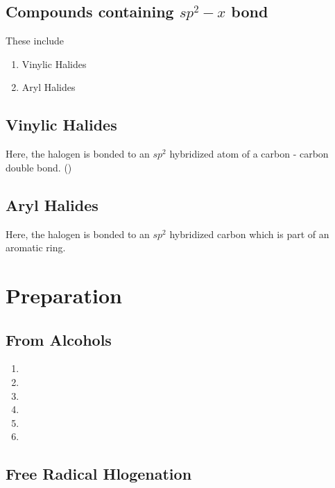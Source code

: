 \documentclass{article}
\begin{document}
\subsection{Compounds containing $sp^2-x$ bond}
These include
\begin{enumerate}
  \item Vinylic Halides
    \item{Aryl Halides}

\end{enumerate}
\subsection*{Vinylic Halides}
Here, the halogen is bonded to an $sp^2$ hybridized atom of a carbon - carbon
double bond. ()
\vspace{5mm}

 \qquad{} 
\subsection*{Aryl Halides}
Here, the halogen is bonded to an $sp^2$ hybridized carbon which
is part of an aromatic ring.
\vspace{5mm}



\section{Preparation}
\subsection{From Alcohols}
\begin{enumerate}
 \item {}
 \item {}
 \item {}
 \item {}
 \item {}
 \item {}
\end{enumerate}
\subsection{Free Radical Hlogenation}

  
\end{document}
